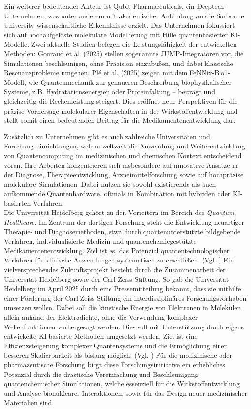Ein weiterer bedeutender Akteur ist Qubit Pharmaceuticals, ein Deeptech-Unternehmen, was unter anderem mit akademischer Anbindung an die Sorbonne University wissenschaftliche Erkenntnisse erzielt. Das Unternehmen fokussiert sich auf hochaufgelöste molekulare Modellierung mit Hilfe quantenbasierter KI-Modelle. Zwei aktuelle Studien belegen die Leistungsfähigkeit der entwickelten Methoden: Gouraud et al. (2025) stellen sogenannte JUMP-Integratoren vor, die Simulationen beschleunigen, ohne Präzision einzubüßen, und dabei klassische Resonanzprobleme umgehen. Plé et al. (2025) zeigen mit dem FeNNix-Bio1-Modell, wie Quantenmechanik zur genaueren Beschreibung biophysikalischer Systeme, z.B. Hydratationsenergien oder Proteinfaltung – beiträgt und gleichzeitig die Rechenleistung steigert. Dies eröffnet neue Perspektiven für die präzise Vorhersage molekularer Eigenschaften in der Wirkstoffentwicklung und stellt somit einen bedeutenden Beitrag für die Medikamentenentwicklung dar. 



Zusätzlich zu Unternehmen gibt es auch zahlreiche Universitäten und Forschungseinrichtungen, welche weltweit die Anwendung und Weiterentwicklung von Quantencomputing im medizinischen und chemischen Kontext entscheidend voran. Ihre Arbeiten konzentrieren sich insbesondere auf innovative Ansätze in der Diagnose, Therapieentwicklung, Arzneimittelforschung sowie auf hochpräzise molekulare Simulationen. Dabei nutzen sie sowohl existierende als auch aufkommende Quantenhardware, oftmals in Kombination mit hybriden oder KI-basierten Verfahren. \\

Die Universität Heidelberg gehört zu den Vorreitern im Bereich des \textit{Quantum Healthcare}. Im Zentrum der dortigen Forschung steht die Entwicklung neuartiger Therapie- und Diagnosemethoden, etwa durch quantenunterstützte bildgebende Verfahren, individualisierte Medizin und quantenchemiegestützte Medikamentenentwicklung. Ziel ist es, das Potenzial quantentechnologischer Verfahren für klinische Anwendungen systematisch zu erschließen. (Vgl. \cite{noauthor_hgsfp_nodate})
Ein vielversprechendes Zukunftsprojekt besteht durch die Zusammenarbeit der Universität Heidelberg sowie der Carl-Zeiss-Stiftung. So gab die Universität Heidelberg im April 2025 durch eine Pressemitteilung bekannt, dass sie mithilfe einer Förderung der Carl-Zeiss-Stiftung ein interdisziplinäres Forschungsvorhaben umsetzen wollen. Dabei soll die kinetische Energie von Elektronen in Molekülen allein anhand der Elektrodichte, ohne die Verwendung komplexer Wellenfunktionen vorhergesagt werden. Dies soll mit Unterstützung durch eigens entwickelte KI-basierte Methoden umgesetzt werden. Ziel ist eine Effizienzsteigerung komplexer Quantensysteme und die Ermöglichung einer besseren Skalierbarkeit als bislang möglich. (Vgl. \cite{}) %
Für die medizinische oder pharmazeutische Forschung birgt diese Forschungsinitiative ein erhebliches Potenzial durch die drastische Vereinfachung und Beschleunigung quantenchemischer Simulationen, welche essenziell für die Wirkstoffentwicklung und Analyse bionuklearer Interaktionen, sowie für das Design neuer medizinischer Materialien sind.\\

